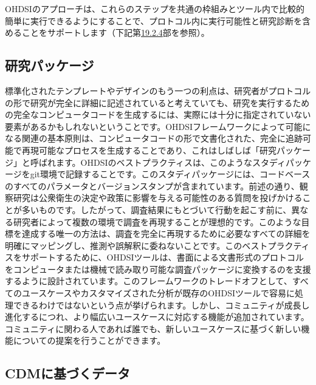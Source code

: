 \documentclass[
  11pt]{book}
\theoremstyle{definition}
\theoremstyle{definition}
\theoremstyle{definition}
\theoremstyle{definition}
\theoremstyle{remark}
\begin{document}
OHDSIのアプローチは、これらのステップを共通の枠組みとツール内で比較的簡単に実行できるようにすることで、プロトコル内に実行可能性と研究診断を含めることをサポートします（下記第\href{https://ohdsi.github.io/TheBookOfOhdsi/StudySteps.html\#Feasibility}{19.2.4}部を参照）。

\subsection{研究パッケージ}\label{ux7814ux7a76ux30d1ux30c3ux30b1ux30fcux30b8}


標準化されたテンプレートやデザインのもう一つの利点は、研究者がプロトコルの形で研究が完全に詳細に記述されていると考えていても、研究を実行するための完全なコンピュータコードを生成するには、実際には十分に指定されていない要素があるかもしれないということです。OHDSIフレームワークによって可能になる関連の基本原則は、コンピュータコードの形で文書化された、完全に追跡可能で再現可能なプロセスを生成することであり、これはしばしば「研究パッケージ」と呼ばれます。OHDSIのベストプラクティスは、このようなスタディパッケージをgit環境で記録することです。このスタディパッケージには、コードベースのすべてのパラメータとバージョンスタンプが含まれています。前述の通り、観察研究は公衆衛生の決定や政策に影響を与える可能性のある質問を投げかけることが多いものです。したがって、調査結果にもとづいて行動を起こす前に、異なる研究者によって複数の環境で調査を再現することが理想的です。このような目標を達成する唯一の方法は、調査を完全に再現するために必要なすべての詳細を明確にマッピングし、推測や誤解釈に委ねないことです。このベストプラクティスをサポートするために、OHDSIツールは、書面による文書形式のプロトコルをコンピュータまたは機械で読み取り可能な調査パッケージに変換するのを支援するように設計されています。このフレームワークのトレードオフとして、すべてのユースケースやカスタマイズされた分析が既存のOHDSIツールで容易に処理できるわけではないという点が挙げられます。しかし、コミュニティが成長し進化するにつれ、より幅広いユースケースに対応する機能が追加されています。コミュニティに関わる人であれば誰でも、新しいユースケースに基づく新しい機能についての提案を行うことができます。

\subsection{CDMに基づくデータ}\label{cdmux306bux57faux3065ux304fux30c7ux30fcux30bf}
\end{document}
